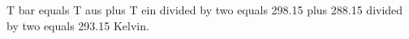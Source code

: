 T bar equals T aus plus T ein divided by two equals 298.15 plus 288.15 divided by two equals 293.15 Kelvin.